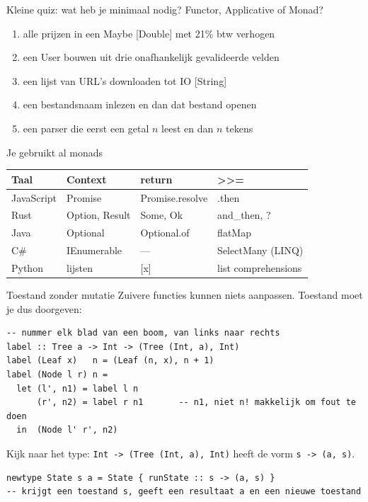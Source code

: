 \documentclass[aspectratio=169,11pt]{beamer}
\newcommand{\hs}{\lstinline[style=hsinline]}
\newcommand{\code}[1]{{\ttfamily\color{kuldonker}#1}}
\begin{document}
\begin{frame}{Kleine quiz: wat heb je minimaal nodig?}
  Functor, Applicative of Monad?
  \begin{enumerate}
    \item alle prijzen in een \code{Maybe [Double]} met 21\% btw verhogen
    \item een \code{User} bouwen uit drie onafhankelijk gevalideerde velden
    \item een lijst van URL's downloaden tot \code{IO [String]}
      \only<4->{\hfill \alert{Applicative} (\code{traverse})}
    \item een bestandsnaam inlezen en dan dat bestand openen
    \item een parser die eerst een getal $n$ leest en dan $n$ tekens
  \end{enumerate}
\end{frame}

\begin{frame}{Je gebruikt al monads}
  \centering
  \begin{tabular}{llll}
    \toprule
    \textbf{Taal} & \textbf{Context} & \textbf{\code{return}} & \textbf{\code{>>=}} \\
    \midrule
    JavaScript & \code{Promise}           & \code{Promise.resolve} & \code{.then} \\
    Rust       & \code{Option}, \code{Result} & \code{Some}, \code{Ok} & \code{and\_then}, \code{?} \\
    Java       & \code{Optional}          & \code{Optional.of}     & \code{flatMap} \\
    C\#        & \code{IEnumerable}       & ---                    & \code{SelectMany} (LINQ) \\
    Python     & lijsten                  & \code{[x]}             & list comprehensions \\
    \bottomrule
  \end{tabular}
 
  \vspace{10pt}
\end{frame}

\begin{frame}[fragile]{Toestand zonder mutatie}
  Zuivere functies kunnen niets aanpassen. Toestand moet je dus \alert{doorgeven}:
\begin{lstlisting}
-- nummer elk blad van een boom, van links naar rechts
label :: Tree a -> Int -> (Tree (Int, a), Int)
label (Leaf x)   n = (Leaf (n, x), n + 1)
label (Node l r) n =
  let (l', n1) = label l n
      (r', n2) = label r n1       -- n1, niet n! makkelijk om fout te doen
  in  (Node l' r', n2)
\end{lstlisting}
  \pause
  Kijk naar het type: \hs{Int -> (Tree (Int, a), Int)} heeft de vorm \hs{s -> (a, s)}.
  \pause
\begin{lstlisting}
newtype State s a = State { runState :: s -> (a, s) }
-- krijgt een toestand s, geeft een resultaat a en een nieuwe toestand
\end{lstlisting}
\end{frame}
 
\end{document}
